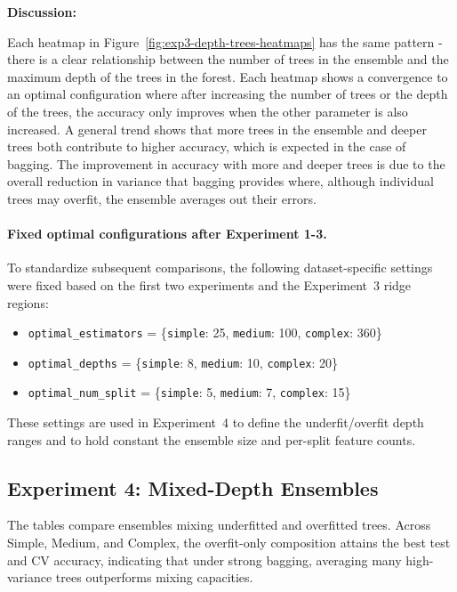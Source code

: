 \documentclass[conference]{IEEEtran}
\begin{document}
\textbf{Discussion:}

  Each heatmap in Figure~\ref{fig:exp3-depth-trees-heatmaps} has the same pattern - there is a clear relationship between the number of trees in the ensemble and the maximum depth of the trees in the forest. Each heatmap shows a convergence to an optimal configuration where after increasing the number of trees or the depth of the trees, the accuracy only improves when the other parameter is also increased. A general trend shows that more trees in the ensemble and deeper trees both contribute to higher accuracy, which is expected in the case of bagging. The improvement in accuracy with more and deeper trees is due to the overall reduction in variance that bagging provides where, although individual trees may overfit, the ensemble averages out their errors.  

\paragraph{Fixed optimal configurations after Experiment 1-3.} To standardize subsequent comparisons, the following dataset-specific settings were fixed based on the first two experiments and the Experiment~3 ridge regions:
\begin{itemize}
  \item \texttt{optimal\_estimators} = \{\texttt{simple}: 25, \texttt{medium}: 100, \texttt{complex}: 360\}
  \item \texttt{optimal\_depths} = \{\texttt{simple}: 8, \texttt{medium}: 10, \texttt{complex}: 20\}
  \item \texttt{optimal\_num\_split} = \{\texttt{simple}: 5, \texttt{medium}: 7, \texttt{complex}: 15\}
\end{itemize}
These settings are used in Experiment~4 to define the underfit/overfit depth ranges and to hold constant the ensemble size and per-split feature counts.

\subsection{Experiment 4: Mixed-Depth Ensembles}
\label{sec:results-exp4}
The tables compare ensembles mixing underfitted and overfitted trees. Across Simple, Medium, and Complex, the overfit-only composition attains the best test and CV accuracy, indicating that under strong bagging, averaging many high-variance trees outperforms mixing capacities. 
\end{document}
